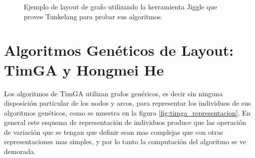 \begin{figure}[h]
	\centering
	\caption{Ejemplo de layout de grafo utilizando la herramienta Jiggle que provee Tunkelang para probar sus algoritmos.}
	\label{fig:jiggle}
\end{figure}


\section{Algoritmos Genéticos de Layout: TimGA y Hongmei He}
Los algoritmos de TimGA \cite{eloranta2001timga} utilizan grafos genéricos, es decir sin ninguna disposición particular de los nodos y arcos, para representar los individuos de sus algoritmos genéticos, como se muestra en la figura \ref{fig:timga_representacion}. En general este esquema de representación de individuos produce que las operación de variación que se tengan que definir sean mas complejas que con otras representaciones mas simples, y por lo tanto la computación del algoritmo se ve demorada.

